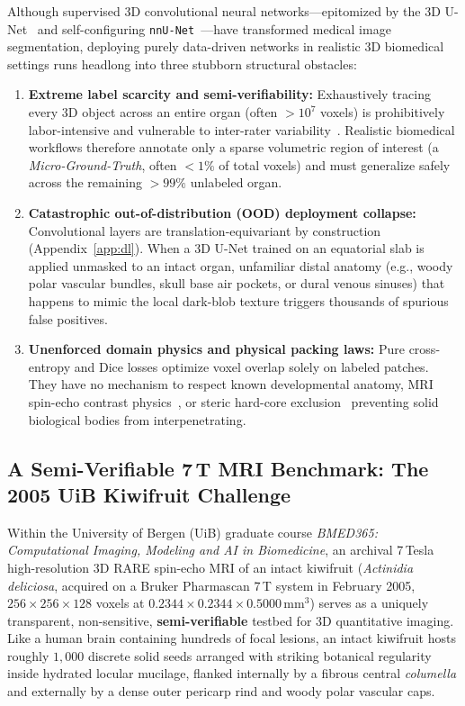 \documentclass[10pt,a4paper]{article}
\renewcommand{\_}{\origunderscore\allowbreak}
\begin{document}
Although supervised 3D convolutional neural networks---epitomized by the 3D U-Net~\cite{ronneberger2015unet,cicek2016unet3d} and self-configuring \texttt{nnU-Net}~\cite{isensee2021nnunet}---have transformed medical image segmentation, deploying purely data-driven networks in realistic 3D biomedical settings runs headlong into three stubborn structural obstacles:
\begin{enumerate}
    \item \textbf{Extreme label scarcity and semi-verifiability:} Exhaustively tracing every 3D object across an entire organ (often $>10^7$ voxels) is prohibitively labor-intensive and vulnerable to inter-rater variability~\cite{warfield2004staple}. Realistic biomedical workflows therefore annotate only a sparse volumetric region of interest (a \emph{Micro-Ground-Truth}, often $<1\%$ of total voxels) and must generalize safely across the remaining $>99\%$ unlabeled organ.
    \item \textbf{Catastrophic out-of-distribution (OOD) deployment collapse:} Convolutional layers are translation-equivariant by construction (Appendix~\ref{app:dl}). When a 3D U-Net trained on an equatorial slab is applied unmasked to an intact organ, unfamiliar distal anatomy (e.g., woody polar vascular bundles, skull base air pockets, or dural venous sinuses) that happens to mimic the local dark-blob texture triggers thousands of spurious false positives.
    \item \textbf{Unenforced domain physics and physical packing laws:} Pure cross-entropy and Dice losses optimize voxel overlap solely on labeled patches. They have no mechanism to respect known developmental anatomy, MRI spin-echo contrast physics~\cite{hennig1986rare}, or steric hard-core exclusion~\cite{matern1986spatial} preventing solid biological bodies from interpenetrating.
\end{enumerate}

\subsection{A Semi-Verifiable 7\,T MRI Benchmark: The 2005 UiB Kiwifruit Challenge}

Within the University of Bergen (UiB) graduate course \emph{BMED365: Computational Imaging, Modeling and AI in Biomedicine}, an archival 7\,Tesla high-resolution 3D RARE spin-echo MRI of an intact kiwifruit (\textit{Actinidia deliciosa}, acquired on a Bruker Pharmascan 7\,T system in February 2005, $256 \times 256 \times 128$ voxels at $0.2344 \times 0.2344 \times 0.5000\,\text{mm}^3$) serves as a uniquely transparent, non-sensitive, \textbf{semi-verifiable} testbed for 3D quantitative imaging. Like a human brain containing hundreds of focal lesions, an intact kiwifruit hosts roughly $1{,}000$ discrete solid seeds arranged with striking botanical regularity~\cite{richardson2011kiwidev,guo2013kiwivascular} inside hydrated locular mucilage, flanked internally by a fibrous central \emph{columella} and externally by a dense outer pericarp rind and woody polar vascular caps.
\end{document}

